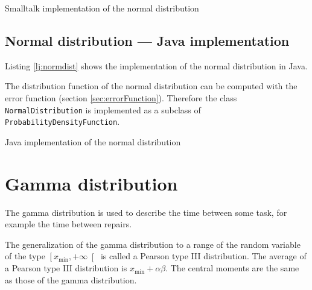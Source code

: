 \documentclass[twoside]{book}
\begin{document}
\begin{listing} Smalltalk implementation of the normal distribution \label{ls:normdist}

\end{listing}


\subsection{Normal distribution --- Java implementation}
\label{sec:normdistjava} Listing \ref{lj:normdist} shows the implementation of the
normal distribution in Java.

The distribution function of the normal distribution can be
computed with the error function (\cf section
\ref{sec:errorFunction}). Therefore the class {\tt
NormalDistribution} is implemented as a subclass of {\tt
ProbabilityDensityFunction}.
\begin{listing} Java implementation of the normal distribution \label{lj:normdist}

\end{listing}

\section{Gamma distribution}
\label{sec:gammadist} The gamma distribution is used to describe
the time between some task, for example the time between repairs.

The generalization of the gamma distribution to a range of the
random variable of the type $\left[x_{\min},+\infty\right[$ is
called a Pearson type III distribution. The average of a Pearson
type III distribution is $x_{\min}+\alpha\beta$. The central
moments are the same as those of the gamma distribution.
\end{document}
